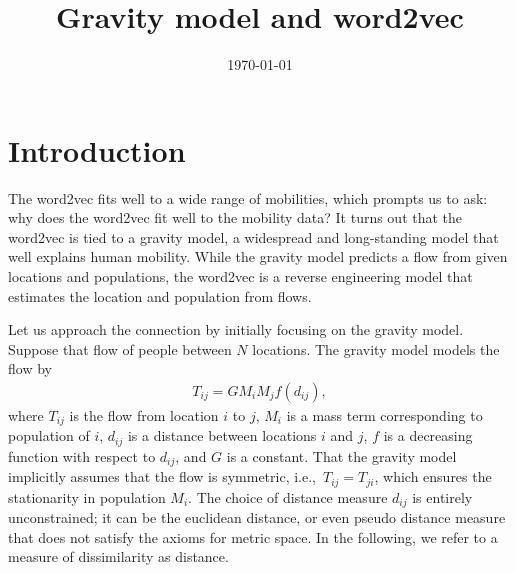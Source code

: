 \documentclass[12pt]{article} %
\def\ie{i.e.,~}
\begin{document}

\title{Gravity model and word2vec} %
\date{\today}
\maketitle %

\section{Introduction}\label{sec:introduction}

The word2vec fits well to a wide range of mobilities, which prompts us to ask: why does the word2vec fit well to the mobility data?
It turns out that the word2vec is tied to a gravity model, a widespread and long-standing model that well explains human mobility.
While the gravity model predicts a flow from given locations and populations, the word2vec is a reverse engineering model that estimates the location and population from flows.

Let us approach the connection by initially focusing on the gravity model.
Suppose that flow of people between $N$ locations. The gravity model models the flow by
\begin{align}
    T_{ij} = G M_i M_j f(d_{ij}), \label{eq:gravity_model}
\end{align}
where $T_{ij}$ is the flow from location $i$ to $j$, $M_i$ is a mass term corresponding to population of $i$, $d_{ij}$ is a distance between locations $i$ and $j$,
$f$ is a decreasing function with respect to $d_{ij}$, and $G$ is a constant.
That the gravity model implicitly assumes that the flow is symmetric, \ie $T_{ij}=T_{ji}$, which ensures the stationarity in population $M_{i}$.
The choice of distance measure $d_{ij}$ is entirely unconstrained; it can be the euclidean distance, or even pseudo distance measure that does not satisfy the axioms for metric space.
In the following, we refer to a measure of dissimilarity as distance.
\end{document}
